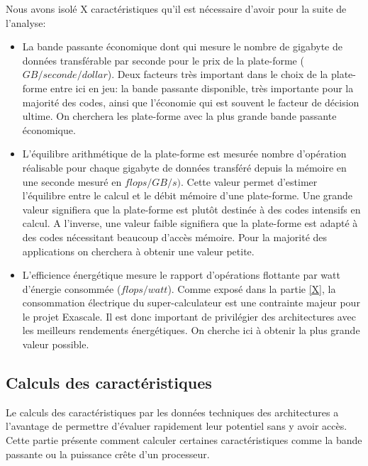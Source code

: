 Nous avons isolé X caractéristiques qu'il est nécessaire d'avoir pour la suite de l'analyse:
\begin{itemize}
    \item La bande passante économique dont qui mesure le nombre de gigabyte de données transférable par seconde pour le prix de la plate-forme ($GB/seconde/dollar$). Deux facteurs très important dans le choix de la plate-forme entre ici en jeu: la bande passante disponible, très importante pour la majorité des codes, ainsi que l'économie qui est souvent le facteur de décision ultime. On cherchera les plate-forme avec la plus grande bande passante économique.
    \item L'équilibre arithmétique de la plate-forme est mesurée nombre d'opération réalisable pour chaque gigabyte de données transféré  depuis la mémoire en une seconde mesuré en  $flops/GB/s)$. Cette valeur permet d'estimer l'équilibre entre le calcul et le débit mémoire d'une plate-forme. Une grande valeur signifiera que la plate-forme est plutôt destinée à des codes intensifs en calcul. A l'inverse, une valeur faible signifiera que la plate-forme est adapté à des codes nécessitant beaucoup d'accès mémoire. Pour la majorité des applications on cherchera à obtenir une valeur petite.
    \item L'efficience énergétique mesure le rapport d'opérations flottante par watt d'énergie consommée ($flops/watt$). Comme exposé dans la partie \ref{X}, la consommation électrique du super-calculateur est une contrainte majeur pour le projet Exascale. Il est donc important de privilégier des architectures avec les meilleurs rendements énergétiques. On cherche ici à obtenir la plus grande valeur possible.
\end{itemize}




\subsection{Calculs des caractéristiques}

Le calculs des caractéristiques par les données techniques des architectures a l'avantage de permettre d'évaluer rapidement leur potentiel sans y avoir accès. Cette partie présente comment calculer certaines caractéristiques comme la bande passante ou la puissance crête d'un processeur.

